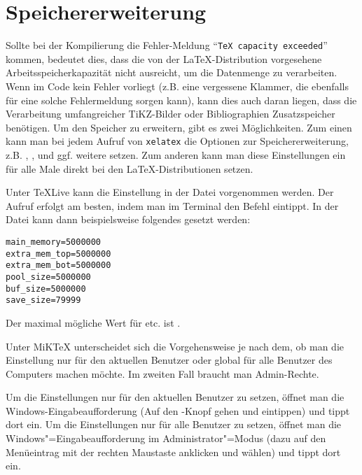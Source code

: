 \section{Speichererweiterung}%
%
\label{sec:Speichererweiterung}
%
Sollte bei der Kompilierung die Fehler-Meldung \enquote{\texttt{TeX capacity exceeded}} kommen,
bedeutet dies, dass die von der \LaTeX-Distribution vorgesehene Arbeitsspeicherkapazität
nicht ausreicht, um die Datenmenge zu verarbeiten.
Wenn im Code kein Fehler vorliegt (z.B. eine vergessene Klammer,
die ebenfalls für eine solche Fehlermeldung sorgen kann),
kann dies auch daran liegen, dass die Verarbeitung umfangreicher TiKZ-Bilder oder Bibliographien 
Zusatzspeicher benötigen.
Um den Speicher zu erweitern, gibt es zwei Möglichkeiten.
Zum einen kann man bei jedem Aufruf von \texttt{xelatex} die Optionen zur Speichererweiterung,
z.B. , ,  und ggf. weitere setzen.
Zum anderen kann man diese Einstellungen ein für alle Male direkt bei den LaTeX-Distributionen setzen.

Unter TeXLive kann die Einstellung in der Datei
 vorgenommen werden.
Der Aufruf erfolgt am besten, indem man im Terminal den Befehl  eintippt.
In der Datei kann dann beispielsweise folgendes gesetzt werden:
\begin{lstlisting}[caption={[Einstellungen zur erweiterten Speichernutzung]Einstellungen zur erweiterten Speichernutzung in der Datei \printfilepath{texmf.cnf} bei TeXLive bzw. \printfilepath{xelatex.ini} bei MiKTeX},label={lst:Speichererweiterung}]
main_memory=5000000
extra_mem_top=5000000
extra_mem_bot=5000000
pool_size=5000000
buf_size=5000000
save_size=79999
\end{lstlisting}
Der maximal mögliche Wert für  etc. ist .

Unter MiKTeX unterscheidet sich die Vorgehensweise je nach dem,
ob man die Einstellung nur für den aktuellen Benutzer oder
global für alle Benutzer des Computers machen möchte.
Im zweiten Fall braucht man Admin-Rechte.

Um die Einstellungen nur für den aktuellen Benutzer zu setzen,
öffnet man die Windows-Eingabeaufforderung
(Auf den -Knopf gehen und  eintippen)
und tippt dort  ein.
Um die Einstellungen nur für alle Benutzer zu setzen,
öffnet man die Windows"=Eingabeaufforderung im Administrator"=Modus
(dazu auf den Menüeintrag  mit der rechten Maustaste anklicken und  wählen)
und tippt dort  ein.

